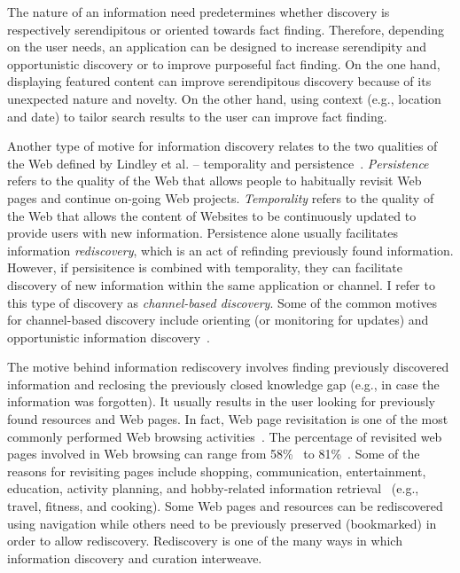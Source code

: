 {{The nature of an information need predetermines whether discovery is respectively serendipitous or oriented towards fact finding. Therefore, depending on the user needs, an application can be designed to increase serendipity and opportunistic discovery or to improve purposeful fact finding. On the one hand, displaying featured content can improve serendipitous discovery because of its unexpected nature and novelty. On the other hand, using context (e.g., location and date) to tailor search results to the user can improve fact finding. 

Another type of motive for information discovery relates to the two qualities of the Web defined by Lindley et al. -- temporality and persistence~\cite{lindley2012s}. \textit{Persistence} refers to the quality of the Web that allows people to habitually revisit Web pages and continue on-going Web projects. \textit{Temporality} refers to the quality of the Web that allows the content of Websites to be continuously updated to provide users with new information. Persistence alone usually facilitates information \textit{rediscovery}, which is an act of refinding previously found information. However, if persisitence is combined with temporality, they can facilitate discovery of new information within the same application or channel. I refer to this type of discovery as \textit{channel-based discovery}. Some of the common motives for channel-based discovery include orienting (or monitoring for updates) and opportunistic information discovery~\cite{lindley2012s}.          

The motive behind information rediscovery involves finding previously discovered information and reclosing the previously closed knowledge gap (e.g., in case the information was forgotten). It usually results in the user looking for previously found resources and Web pages. In fact, Web page revisitation is one of the most commonly performed Web browsing activities~\cite{adar2008large,cockburn2003improving}. The percentage of revisited web pages involved in Web browsing can range from 58\%~\cite{tauscher1997people} to 81\%~\cite{cockburn2001web}. Some of the reasons for revisiting pages include shopping, communication, entertainment, education, activity planning, and hobby-related information retrieval~\cite{adar2008large} (e.g., travel, fitness, and cooking). Some Web pages and resources can be rediscovered using navigation while others need to be previously preserved (bookmarked) in order to allow rediscovery. Rediscovery is one of the many ways in which information discovery and curation interweave. 
}

}
